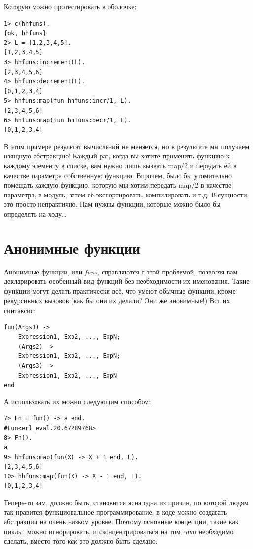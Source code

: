 \documentclass[a4paper,12pt]{report}
\newcommand{\ops}{\colorbox{lgreen}}
\begin{document}
Которую можно протестировать в оболочке:
\begin{lstlisting}[style=erlang]
1> c(hhfuns).
{ok, hhfuns}
2> L = [1,2,3,4,5].
[1,2,3,4,5]
3> hhfuns:increment(L).
[2,3,4,5,6]
4> hhfuns:decrement(L).
[0,1,2,3,4]
5> hhfuns:map(fun hhfuns:incr/1, L).
[2,3,4,5,6]
6> hhfuns:map(fun hhfuns:decr/1, L).
[0,1,2,3,4]
\end{lstlisting}

В этом примере результат вычислений не меняется, но в результате мы получаем изящную абстракцию! Каждый раз, когда вы хотите применить функцию к каждому элементу в списке, вам нужно лишь вызвать \ops{map/2} и передать ей в качестве параметра собственную функцию. Впрочем, было бы утомительно помещать каждую функцию, которую мы хотим передать \ops{map/2} в качестве параметра, в модуль, затем её экспортировать, компилировать и т.д. В сущности, это просто непрактично. Нам нужны функции, которые можно было бы определять на ходу\ldots
\section{Анонимные функции}
\label{anonymous_functions}
Анонимные функции, или \emph{funs}, справляются с этой проблемой, позволяя вам декларировать особенный вид функций без необходимости их именования. Такие функции могут делать практически всё, что умеют обычные функции, кроме рекурсивных вызовов (как бы они их делали? Они же анонимные!) Вот их синтаксис:
\begin{lstlisting}[style=erlang]
fun(Args1) ->
    Expression1, Exp2, ..., ExpN;
    (Args2) ->
    Expression1, Exp2, ..., ExpN;
    (Args3) ->
    Expression1, Exp2, ..., ExpN
end
\end{lstlisting}
А использовать их можно следующим способом:
\begin{lstlisting}[style=erlang]
7> Fn = fun() -> a end.
#Fun<erl_eval.20.67289768>
8> Fn().
a
9> hhfuns:map(fun(X) -> X + 1 end, L).
[2,3,4,5,6]
10> hhfuns:map(fun(X) -> X - 1 end, L).
[0,1,2,3,4]
\end{lstlisting}
Теперь\--то вам, должно быть, становится ясна одна из причин, по которой людям так нравится функциональное программирование: в коде можно создавать абстракции на очень низком уровне. Поэтому основные концепции, такие как циклы, можно игнорировать, и сконцентрироваться на том, \emph{что} необходимо сделать, вместо того \emph{как} это должно быть сделано.
\end{document}
